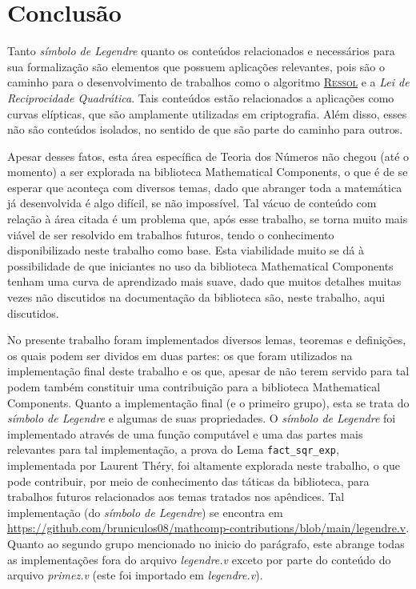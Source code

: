 \chapter{Conclusão}
\label{cap:conclusao}

Tanto \textit{símbolo de Legendre} quanto os conteúdos relacionados e necessários para sua formalização são elementos que possuem aplicações relevantes, pois são o caminho para o desenvolvimento de trabalhos como o algoritmo \hyperref[algo:ressol]{\textsc{Ressol}} e a \textit{Lei de Reciprocidade Quadrática}. Tais conteúdos estão relacionados a aplicações como curvas elípticas, que são amplamente utilizadas em criptografia. Além disso, esses não são conteúdos isolados, no sentido de que são parte do caminho para outros.

Apesar desses fatos, esta área específica de Teoria dos Números não chegou (até o momento) a ser explorada na biblioteca Mathematical Components, o que é de se esperar que aconteça com diversos temas, dado que abranger toda a matemática já desenvolvida é algo difícil, se não impossível. Tal vácuo de conteúdo com relação à área citada é um problema que, após esse trabalho, se torna muito mais viável de ser resolvido em trabalhos futuros, tendo o conhecimento disponibilizado neste trabalho como base. Esta viabilidade muito se dá à possibilidade de que iniciantes no uso da biblioteca Mathematical Components tenham uma curva de aprendizado mais suave, dado que muitos detalhes muitas vezes não discutidos na documentação da biblioteca são, neste trabalho, aqui discutidos.


No presente trabalho foram implementados diversos lemas, teoremas e definições, os quais podem ser dividos em duas partes: os que foram utilizados na implementação final deste trabalho e os que, apesar de não terem servido para tal podem também constituir uma contribuição para a biblioteca Mathematical Components. 
Quanto a implementação final (e o primeiro grupo), esta se trata do \textit{símbolo de Legendre} e algumas de suas propriedades. O \textit{símbolo de Legendre} foi implementado através de uma função computável e uma das partes mais relevantes para tal implementação, a prova do Lema \lstinline[language=coq]|fact_sqr_exp|, implementada por Laurent Théry, foi altamente explorada neste trabalho, o que pode contribuir, por meio de conhecimento das táticas da biblioteca, para trabalhos futuros relacionados aos temas tratados nos apêndices. Tal implementação (do \textit{símbolo de Legendre}) se encontra em \url{https://github.com/bruniculos08/mathcomp-contributions/blob/main/legendre.v}. Quanto ao segundo grupo mencionado no inicio do parágrafo, este abrange todas as implementações fora do arquivo \textit{legendre.v} exceto por parte do conteúdo do arquivo \textit{primez.v} (este foi importado em \textit{legendre.v}).

